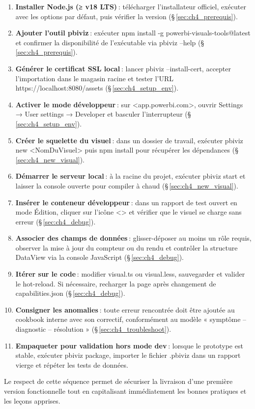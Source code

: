 \begin{enumerate}[label=\textbf{Étape \arabic*:}, wide=0pt, itemsep=.8em]
  \item \textbf{Installer Node.js (≥ v18 LTS)} : télécharger l’installateur officiel, exécuter avec les options par défaut, puis vérifier la version (\S\,\ref{sec:ch4_prerequis}).

  \item \textbf{Ajouter l’outil pbiviz} : exécuter npm install -g powerbi-visuals-tools@latest et confirmer la disponibilité de l’exécutable via pbiviz --help (\S\,\ref{sec:ch4_prerequis}).

  \item \textbf{Générer le certificat SSL local} : lancer pbiviz --install-cert, accepter l’importation dans le magasin racine et tester l’URL https://localhost:8080/assets (\S\,\ref{sec:ch4_setup_env}).

  \item \textbf{Activer le mode développeur} : sur <app.powerbi.com>, ouvrir Settings → User settings → Developer et basculer l’interrupteur (\S\,\ref{sec:ch4_setup_env}).

  \item \textbf{Créer le squelette du visuel} : dans un dossier de travail, exécuter pbiviz new <NomDuVisuel> puis npm install pour récupérer les dépendances (\S\,\ref{sec:ch4_new_visual}).

  \item \textbf{Démarrer le serveur local} : à la racine du projet, exécuter pbiviz start et laisser la console ouverte pour compiler à chaud (\S\,\ref{sec:ch4_new_visual}).

  \item \textbf{Insérer le conteneur développeur} : dans un rapport de test ouvert en mode Édition, cliquer sur l’icône <> et vérifier que le visuel se charge sans erreur (\S\,\ref{sec:ch4_debug}).

  \item \textbf{Associer des champs de données} : glisser-déposer au moins un rôle requis, observer la mise à jour du compteur ou du rendu et contrôler la structure DataView via la console JavaScript (\S\,\ref{sec:ch4_debug}).

  \item \textbf{Itérer sur le code} : modifier visual.ts ou visual.less, sauvegarder et valider le hot-reload. Si nécessaire, recharger la page après changement de capabilities.json (\S\,\ref{sec:ch4_debug}).

  \item \textbf{Consigner les anomalies} : toute erreur rencontrée doit être ajoutée au cookbook interne avec son correctif, conformément au modèle « symptôme – diagnostic – résolution » (\S\,\ref{sec:ch4_troubleshoot}).

  \item \textbf{Empaqueter pour validation hors mode dev} : lorsque le prototype est stable, exécuter pbiviz package, importer le fichier .pbiviz dans un rapport vierge et répéter les tests de données.
\end{enumerate}

Le respect de cette séquence permet de sécuriser la livraison d’une première version fonctionnelle tout en capitalisant immédiatement les bonnes pratiques et les leçons apprises. 